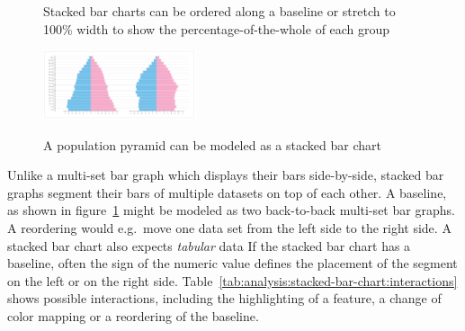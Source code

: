 \begin{figure}
  \centering
    \qquad
    \caption{Stacked bar charts can be ordered along a baseline or stretch to 100\% width to show the percentage-of-the-whole of each group}%
    \label{fig:analysis:stacked-bar-chart}
\end{figure}
\begin{figure}
  \centering
    \includegraphics[width=0.4\textwidth]{figures/analysis/population-pyramid.png}%
    \label{fig:analysis:population-pyramid}
    \caption{A population pyramid can be modeled as a stacked bar chart}%
\end{figure}

Unlike a multi-set bar graph which displays their bars side-by-side, stacked bar graphs segment their bars of multiple datasets on top of each other.
A baseline, as shown in figure~\ref{fig:analysis:stacked-bar-chart} might be modeled as two back-to-back multi-set bar graphs. A reordering would e.g.\ move one data set from the left side to the right side.
A stacked bar chart also expects \emph{tabular} data
If the stacked bar chart has a baseline, often the sign of the numeric value defines the placement of the segment on the left or on the right side.
Table~\ref{tab:analysis:stacked-bar-chart:interactions} shows possible interactions, including the highlighting of a feature, a change of color mapping or a reordering of the baseline.

